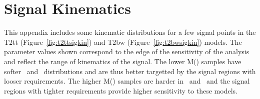 \section{Signal Kinematics} 
\label{app:sigkin}

This appendix includes some kinematic distributions for a few signal
points in the T2tt (Figure~\ref{fig:t2ttsigkin}) and T2bw 
(Figure~\ref{fig:t2bwsigkin}) models. The parameter values shown correspond
to the edge of the sensitivity of the analysis and reflect the range
of kinematics of the signal. The lower M(\sctop) samples have softer
\met\ and \mt\ distributions and are thus better targetted by the signal
regions with looser requirements. The higher M(\sctop) samples are
harder in \met\ and \mt\ and the signal regions with tighter
requirements provide higher sensitivity to these models.

